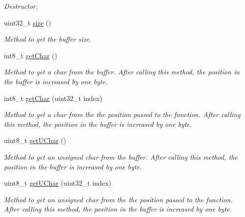 \begin{DoxyCompactItemize}
\begin{DoxyCompactList}\small\item\em Destructor. \item\end{DoxyCompactList}\item 
uint32\_\-t \hyperlink{classBuffer_a61907c35a945626945f77752ec9eaa80}{size} ()
\begin{DoxyCompactList}\small\item\em Method to get the buffer size. \item\end{DoxyCompactList}\item 
int8\_\-t \hyperlink{classBuffer_a32f8331e3bce9db17da619458b424d7e}{getChar} ()
\begin{DoxyCompactList}\small\item\em Method to get a char from the buffer. After calling this method, the position in the buffer is increased by one byte. \item\end{DoxyCompactList}\item 
int8\_\-t \hyperlink{classBuffer_aaa0175c5b1b72ced0b8edffa157110a5}{getChar} (uint32\_\-t index)
\begin{DoxyCompactList}\small\item\em Method to get a char from the the position passed to the function. After calling this method, the position in the buffer is increased by one byte. \item\end{DoxyCompactList}\item 
uint8\_\-t \hyperlink{classBuffer_ab2d089a99d5bceb23d07d00bf745119a}{getUChar} ()
\begin{DoxyCompactList}\small\item\em Method to get an unsigned char from the buffer. After calling this method, the position in the buffer is increased by one byte. \item\end{DoxyCompactList}\item 
uint8\_\-t \hyperlink{classBuffer_ac9e1313de63fd9815b38ace7bddc22d8}{getUChar} (uint32\_\-t index)
\begin{DoxyCompactList}\small\item\em Method to get an unsigned char from the the position passed to the function. After calling this method, the position in the buffer is increased by one byte. \item\end{DoxyCompactList}\item 

\end{DoxyCompactItemize}
